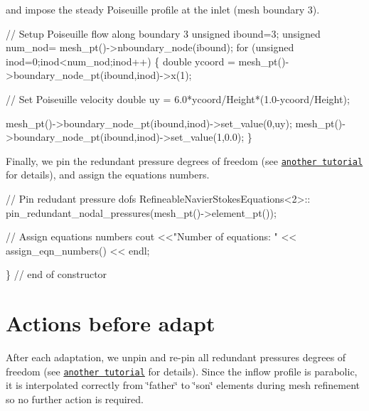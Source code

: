 and impose the steady Poiseuille profile at the inlet (mesh boundary 3).


\begin{DoxyCodeInclude}
  

  \textcolor{comment}{// Setup Poiseuille flow along boundary 3}
  \textcolor{keywordtype}{unsigned} ibound=3;
  \textcolor{keywordtype}{unsigned} num\_nod= mesh\_pt()->nboundary\_node(ibound);
  \textcolor{keywordflow}{for} (\textcolor{keywordtype}{unsigned} inod=0;inod<num\_nod;inod++)
   \{
    \textcolor{keywordtype}{double} ycoord = mesh\_pt()->boundary\_node\_pt(ibound,inod)->x(1);

    \textcolor{comment}{// Set Poiseuille velocity}
    \textcolor{keywordtype}{double} uy = 6.0*ycoord/Height*(1.0-ycoord/Height);
    
    mesh\_pt()->boundary\_node\_pt(ibound,inod)->set\_value(0,uy);
    mesh\_pt()->boundary\_node\_pt(ibound,inod)->set\_value(1,0.0);
   \}   

\end{DoxyCodeInclude}


Finally, we pin the redundant pressure degrees of freedom (see \href{../../../navier_stokes/adaptive_driven_cavity/html/index.html}{\tt another tutorial} for details), and assign the equations numbers.


\begin{DoxyCodeInclude}

  
  \textcolor{comment}{// Pin redudant pressure dofs}
  RefineableNavierStokesEquations<2>::
   pin\_redundant\_nodal\_pressures(mesh\_pt()->element\_pt());
  
  \textcolor{comment}{// Assign equations numbers}
  cout <<\textcolor{stringliteral}{"Number of equations: "} << assign\_eqn\_numbers() << endl;  
 
\} \textcolor{comment}{// end of constructor}

\end{DoxyCodeInclude}




 

\hypertarget{index_after_adapt}{}\section{Actions before adapt}\label{index_after_adapt}
After each adaptation, we unpin and re-\/pin all redundant pressures degrees of freedom (see \href{../../../navier_stokes/adaptive_driven_cavity/html/index.html}{\tt another tutorial} for details). Since the inflow profile is parabolic, it is interpolated correctly from \char`\"{}father\char`\"{} to \char`\"{}son\char`\"{} elements during mesh refinement so no further action is required.


